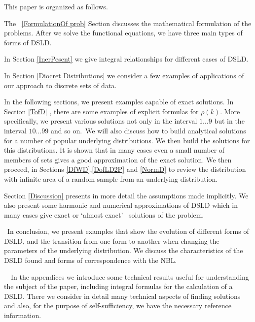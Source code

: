 \documentclass[titlepage,fleqn]{article}%
\begin{document}
This paper is organized as follows.

The\
\ref{FormulationOf prob}
Section discusses the mathematical formulation of the problems. After we solve
the functional equations, we have three main types of forms of DSLD.

In Section
\ref{InerPesent}
we give integral relationships for different cases of DSLD.

In Section
\ref{Diocret Distributions}
we consider a few examples of applications of our approach to discrete sets of data.

In the following sections, we present examples capable of exact solutions. In
Section
\ref{TofD}%
, there are some examples of explicit formulas for $\rho(k)$. More
specifically, we present various solutions not only in the interval $1\ldots9$
but in the interval $10\ldots99$ and so on.~We will also discuss how to build
analytical solutions for a number of popular underlying distributions. We then
build the solutions for this distributions. It is shown that in many cases
even a small number of members of sets gives a good approximation of the exact
solution. We then proceed, in Sections
\ref{DfWD},\ref{DofLD2P} and \ref{NormD}
to review the distribution with infinite area of a random sample from an
underlying distribution.

Section
\ref{Discussion}
presents in more detail the assumptions made implicitly. We also present some
harmonic and numerical approximations of DSLD which in many cases give exact
or `almost exact' \ solutions of the problem.

~In conclusion, we present examples that show the evolution of different forms
of DSLD, and the transition from one form to another when changing the
parameters of the underlying distribution. We discuss the characteristics of
the DSLD found and forms of correspondence with the NBL.

~~In the appendices we introduce some technical results useful for
understanding the subject of the paper, including integral formulas for the
calculation of a DSLD. There we consider in detail many technical aspects of
finding solutions and also, for the purpose of self-sufficiency, we have the
necessary reference information.
\end{document}
